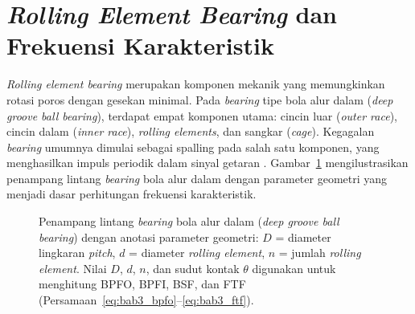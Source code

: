 \section{\emph{Rolling Element Bearing} dan Frekuensi Karakteristik}
\label{sec:bab3_bantalan_bpfx}

\emph{Rolling element bearing} merupakan
komponen mekanik yang memungkinkan rotasi poros dengan gesekan minimal. Pada
\emph{bearing} tipe bola alur dalam (\emph{deep groove ball bearing}), terdapat
empat komponen utama: cincin luar (\emph{outer race}), cincin dalam
(\emph{inner race}), \emph{rolling elements}, dan sangkar
(\emph{cage}). Kegagalan \emph{bearing} umumnya dimulai sebagai spalling pada salah
satu komponen, yang menghasilkan impuls periodik dalam sinyal getaran
. Gambar~\ref{fig:bab3_bearing_geom} mengilustrasikan
penampang lintang \emph{bearing} bola alur dalam dengan parameter geometri yang
menjadi dasar perhitungan frekuensi karakteristik.

\begin{figure}[ht]
  \centering
  \caption{Penampang lintang \emph{bearing} bola alur dalam (\emph{deep groove ball
           bearing}) dengan anotasi parameter geometri: $D$ = diameter lingkaran
           \emph{pitch}, $d$ = diameter \emph{rolling element}, $n$ = jumlah \emph{rolling element}. Nilai $D$, $d$, $n$, dan sudut kontak $\theta$ digunakan
           untuk menghitung BPFO, BPFI, BSF, dan FTF
           (Persamaan~\ref{eq:bab3_bpfo}--\ref{eq:bab3_ftf}).}
  \label{fig:bab3_bearing_geom}
\end{figure}

